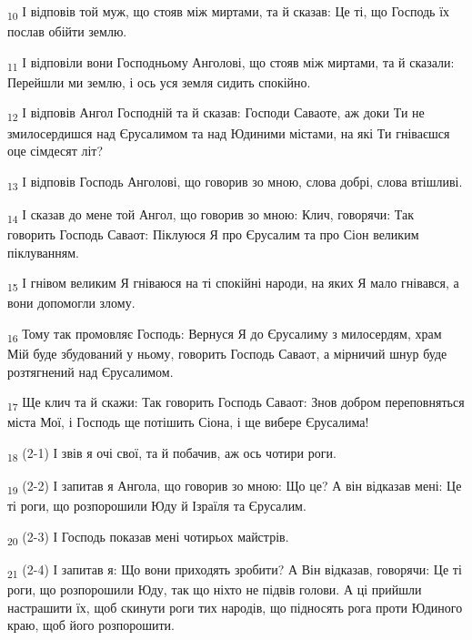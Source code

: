 \begin{tcolorbox}
\textsubscript{10} І відповів той муж, що стояв між миртами, та й сказав: Це ті, що Господь їх послав обійти землю.
\end{tcolorbox}
\begin{tcolorbox}
\textsubscript{11} І відповіли вони Господньому Анголові, що стояв між миртами, та й сказали: Перейшли ми землю, і ось уся земля сидить спокійно.
\end{tcolorbox}
\begin{tcolorbox}
\textsubscript{12} І відповів Ангол Господній та й сказав: Господи Саваоте, аж доки Ти не змилосердишся над Єрусалимом та над Юдиними містами, на які Ти гніваєшся оце сімдесят літ?
\end{tcolorbox}
\begin{tcolorbox}
\textsubscript{13} І відповів Господь Анголові, що говорив зо мною, слова добрі, слова втішливі.
\end{tcolorbox}
\begin{tcolorbox}
\textsubscript{14} І сказав до мене той Ангол, що говорив зо мною: Клич, говорячи: Так говорить Господь Саваот: Піклуюся Я про Єрусалим та про Сіон великим піклуванням.
\end{tcolorbox}
\begin{tcolorbox}
\textsubscript{15} І гнівом великим Я гніваюся на ті спокійні народи, на яких Я мало гнівався, а вони допомогли злому.
\end{tcolorbox}
\begin{tcolorbox}
\textsubscript{16} Тому так промовляє Господь: Вернуся Я до Єрусалиму з милосердям, храм Мій буде збудований у ньому, говорить Господь Саваот, а мірничий шнур буде розтягнений над Єрусалимом.
\end{tcolorbox}
\begin{tcolorbox}
\textsubscript{17} Ще клич та й скажи: Так говорить Господь Саваот: Знов добром переповняться міста Мої, і Господь ще потішить Сіона, і ще вибере Єрусалима!
\end{tcolorbox}
\begin{tcolorbox}
\textsubscript{18} (2-1) І звів я очі свої, та й побачив, аж ось чотири роги.
\end{tcolorbox}
\begin{tcolorbox}
\textsubscript{19} (2-2) І запитав я Ангола, що говорив зо мною: Що це? А він відказав мені: Це ті роги, що розпорошили Юду й Ізраїля та Єрусалим.
\end{tcolorbox}
\begin{tcolorbox}
\textsubscript{20} (2-3) І Господь показав мені чотирьох майстрів.
\end{tcolorbox}
\begin{tcolorbox}
\textsubscript{21} (2-4) І запитав я: Що вони приходять зробити? А Він відказав, говорячи: Це ті роги, що розпорошили Юду, так що ніхто не підвів голови. А ці прийшли настрашити їх, щоб скинути роги тих народів, що підносять рога проти Юдиного краю, щоб його розпорошити.
\end{tcolorbox}
